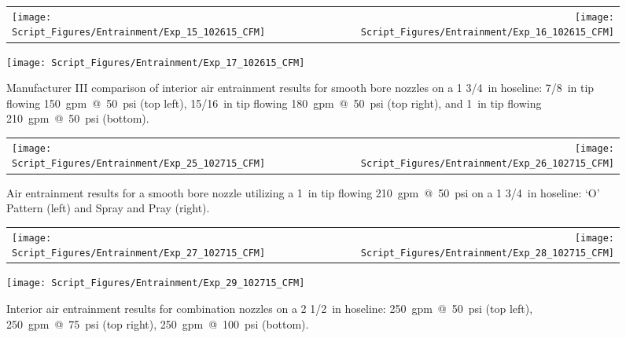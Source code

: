 \documentclass[12pt,oneside]{book}
\begin{document}
\clearpage

\begin{figure}[!ht]
\begin{tabular*}{\textwidth}{lr}
\texttt{[image: Script\_Figures/Entrainment/Exp\_15\_102615\_CFM]} &
\texttt{[image: Script\_Figures/Entrainment/Exp\_16\_102615\_CFM]} \\
\end{tabular*}
\centering
\texttt{[image: Script\_Figures/Entrainment/Exp\_17\_102615\_CFM]} 
\caption[Manufacturer III Air Entrainment from Smooth Bore Nozzle Varying Pressure and Flowrate]{Manufacturer III comparison of interior air entrainment results for smooth bore nozzles on a 1 3/4~in hoseline: 7/8~in tip flowing 150~gpm~@~50~psi (top left), 15/16~in tip flowing 180~gpm~@~50~psi (top right), and 1~in tip flowing 210~gpm~@~50~psi (bottom).}
\label{fig:1_5_Interior_Smooth_Bore_Manufacturer_III}
\end{figure}

\clearpage

\begin{figure}[!ht]
\begin{tabular*}{\textwidth}{lr}
\texttt{[image: Script\_Figures/Entrainment/Exp\_25\_102715\_CFM]} &
\texttt{[image: Script\_Figures/Entrainment/Exp\_26\_102715\_CFM]} \\
\end{tabular*}
\caption[Air Entrainment for `O' Pattern versus `Spray and Pray']{Air entrainment results for a smooth bore nozzle utilizing a 1~in tip flowing 210~gpm~@~50~psi on a 1 3/4~in hoseline: `O' Pattern (left) and Spray and Pray (right).}
\label{fig:Nozzle_Movement}
\end{figure}

\clearpage

\begin{figure}[!ht]
\begin{tabular*}{\textwidth}{lr}
\texttt{[image: Script\_Figures/Entrainment/Exp\_27\_102715\_CFM]} &
\texttt{[image: Script\_Figures/Entrainment/Exp\_28\_102715\_CFM]} \\
\end{tabular*}
\centering
\texttt{[image: Script\_Figures/Entrainment/Exp\_29\_102715\_CFM]} 
\caption[Air Entrainment for 2~1/2~in Hoseline with Combination Nozzle from Interior]{Interior air entrainment results for combination nozzles on a 2 1/2~in hoseline: 250~gpm~@~50~psi (top left), 250~gpm~@~75~psi (top right), 250~gpm~@~100~psi (bottom).}
\label{fig:2_5_Interior_Combination}
\end{figure}
\end{document}
